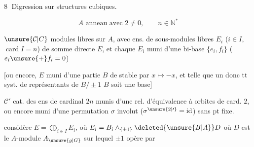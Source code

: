 \textcircled{8} Digression sur structures cubiques.

\[
 A\text{ anneau avec }2\ne0,\qquad n\in\mathbb{N}^{*}
\]

$\unsure{\mathcal{C}|C}$  modules libres  sur $A$, avec  ens. de  sous-modules libres $E_i$ ($i\in I$, $\operatorname{card} I=n$) de somme directe $E$, et chaque $E_i$ muni d'une bi-base $\{e_i,f_i\}$ ($e_i\unsure{+}f_i=0$)

[ou encore, $E$ muni d'une partie $B$ de  stable par $x\longmapsto-x$, et telle que un \textendash{} donc tt \textendash{} syst. de représentants de $B/\pm1$  $B$ soit une base]

$\mathcal{C}'$ cat. des ens  de cardinal $2n$ munis d'une rel. d'équivalence  à orbites de card. $2$, ou encore muni d'une permutation $\sigma$ involut ($\sigma^{\unsure{2|\prime}}=\mathrm{id}$) sans pt fixe.

considère $E=\bigoplus_{i\in I}E_i$, où $E_i=B_i\wedge_{\{\pm1\}}\deleted{\unsure{B|A}}D$ où $D$ est le $A$-module $A_{\unsure{g|G}}$ sur lequel $\pm1$ opère par 
